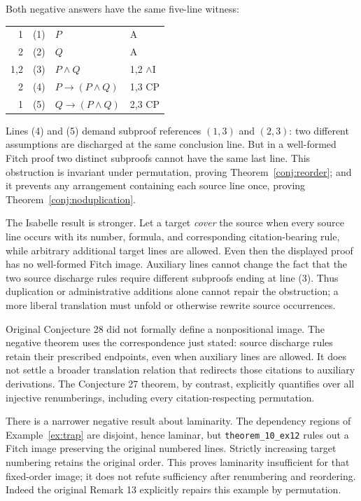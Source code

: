 \documentclass[11pt]{article}
\makeatletter
\theoremstyle{plain}
\theoremstyle{definition}
\theoremstyle{remark}
\newcommand{\dep}[1]{\textup{#1}}
\newenvironment{lemmonproof}
  {\begin{center}\begin{tabular}{@{}r@{\hspace{1.5em}}r@{\hspace{0.6em}}l@{\hspace{2.5em}}l@{}}}
  {\end{tabular}\end{center}}
\makeatother
\begin{document}
Both negative answers have the same five-line witness:

\begin{lemmonproof}
\dep{1}   & (1) & $P$                         & A \\
\dep{2}   & (2) & $Q$                         & A \\
\dep{1,2} & (3) & $P \wedge Q$                & 1,2 $\wedge$I \\
\dep{2}   & (4) & $P \to (P \wedge Q)$        & 1,3 CP \\
\dep{1}   & (5) & $Q \to (P \wedge Q)$        & 2,3 CP \\
\end{lemmonproof}

\noindent Lines (4) and (5) demand subproof references $(1,3)$ and $(2,3)$:
two different assumptions are discharged at the same conclusion line. But in
a well-formed Fitch proof two distinct subproofs cannot have the same last
line. This obstruction is invariant under permutation, proving
Theorem~\ref{conj:reorder}; and it prevents any arrangement containing each
source line once, proving Theorem~\ref{conj:noduplication}.

The Isabelle result is stronger. Let a target \emph{cover} the source when
every source line occurs with its number, formula, and corresponding
citation-bearing rule, while arbitrary additional target lines are allowed.
Even then the displayed proof has no well-formed Fitch image. Auxiliary lines
cannot change the fact that the two source discharge rules require different
subproofs ending at line (3). Thus duplication or administrative additions
alone cannot repair the obstruction; a more liberal translation must unfold
or otherwise rewrite source occurrences.

Original Conjecture 28 did not formally define a nonpositional image. The
negative theorem uses the correspondence just stated: source discharge rules
retain their prescribed endpoints, even when auxiliary lines are allowed.
It does not settle a broader translation relation that redirects those
citations to auxiliary derivations. The Conjecture 27 theorem, by contrast,
explicitly quantifies over all injective renumberings, including every
citation-respecting permutation.

There is a narrower negative result about laminarity. The dependency regions
of Example~\ref{ex:trap} are disjoint, hence laminar, but
\verb|theorem_10_ex12| rules out a Fitch image preserving the original
numbered lines. Strictly increasing target numbering retains the original
order. This proves laminarity insufficient for that fixed-order image; it
does not refute sufficiency after renumbering and reordering. Indeed the
original Remark 13 explicitly repairs this example by permutation.
\end{document}
